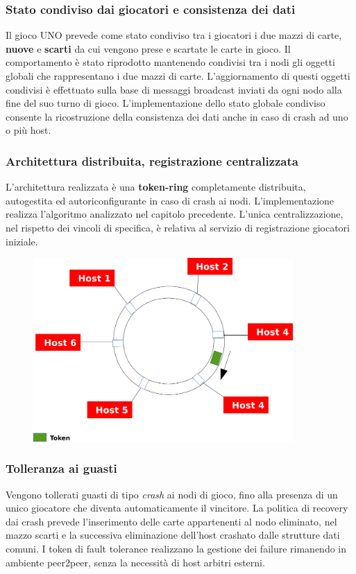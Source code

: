 \documentclass[10pt,a4paper]{article}
\begin{document}
\subsubsection{Stato condiviso dai giocatori e consistenza dei dati}
Il gioco UNO prevede come stato condiviso tra i giocatori i due mazzi di carte, \textbf{nuove} e \textbf{scarti} da cui vengono prese e scartate le carte in gioco. Il comportamento è stato riprodotto mantenendo condivisi tra i nodi gli oggetti globali che rappresentano i due mazzi di carte. L'aggiornamento di questi oggetti condivisi è effettuato sulla base di messaggi broadcast inviati da ogni nodo alla fine del suo turno di gioco. L'implementazione dello stato globale condiviso consente la ricostruzione della consistenza dei dati anche in caso di crash ad uno o più host.
 
\subsubsection{Architettura distribuita, registrazione centralizzata}
L'architettura realizzata è una \textbf{token-ring} completamente distribuita, autogestita ed autoriconfigurante in caso di crash ai nodi. L'implementazione realizza l'algoritmo analizzato nel capitolo precedente. L'unica centralizzazione, nel rispetto dei vincoli di specifica, è relativa al servizio di registrazione giocatori iniziale.

\begin{figure}[H]
\begin{center}
\includegraphics[height=7cm, keepaspectratio]{token-ring.png}
\end{center}
\end{figure}

\subsubsection{Tolleranza ai guasti}
Vengono tollerati guasti di tipo \textit{crash} ai nodi di gioco, fino alla presenza di un unico giocatore che diventa automaticamente il vincitore. La politica di recovery dai crash prevede l'inserimento delle carte appartenenti al nodo eliminato, nel mazzo scarti e la successiva eliminazione dell'host crashato dalle strutture dati comuni. I token di fault tolerance realizzano la gestione dei failure rimanendo in ambiente peer2peer, senza la necessità di host arbitri esterni.   
\end{document}
